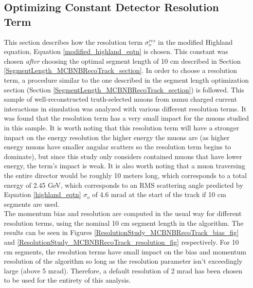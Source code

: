 \subsection{Optimizing Constant Detector Resolution Term}\label{ResolutionStudy_MCBNBRecoTrack_section}
This section describes how the resolution term $\sigma_o^{res}$ in the modified Highland equation, Equation \ref{modified_highland_eqtn} is chosen. This constant was chosen \textit{after} choosing the optimal segment length of 10 cm described in Section \ref{SegmentLength_MCBNBRecoTrack_section}. In order to choose a resolution term, a procedure similar to the one described in the segment length optimization section (Section \ref{SegmentLength_MCBNBRecoTrack_section}) is followed. This sample of well-reconstructed truth-selected muons from numu charged current interactions in simulation was analyzed with various different resolution terms. It was found that the resolution term has a very small impact for the muons studied in this sample. It is worth noting that this resolution term will have a stronger impact on the energy resolution the higher energy the muons are (as higher energy muons have smaller angular scatters so the resolution term begins to dominate), but since this study only considers contained muons that have lower energy, the term's impact is weak. It is also worth noting that a muon traversing the entire director would be roughly 10 meters long, which corresponds to a total energy of 2.45 GeV, which corresponds to an RMS scattering angle predicted by Equation \ref{highland_eqtn} $\sigma_o$ of 4.6 mrad at the start of the track if 10 cm segments are used.\\

The momentum bias and resolution are computed in the usual way for different resolution terms, using the nominal 10 cm segment length in the algorithm. The results can be seen in Figures \ref{ResolutionStudy_MCBNBRecoTrack_bias_fig} and \ref{ResolutionStudy_MCBNBRecoTrack_resolution_fig} respectively. For 10 cm segments, the resolution terms have small impact on the bias and momentum resolution of the algorithm so long as the resolution parameter isn't exceedingly large (above 5 mrad). Therefore, a default resolution of 2 mrad has been chosen to be used for the entirety of this analysis.

